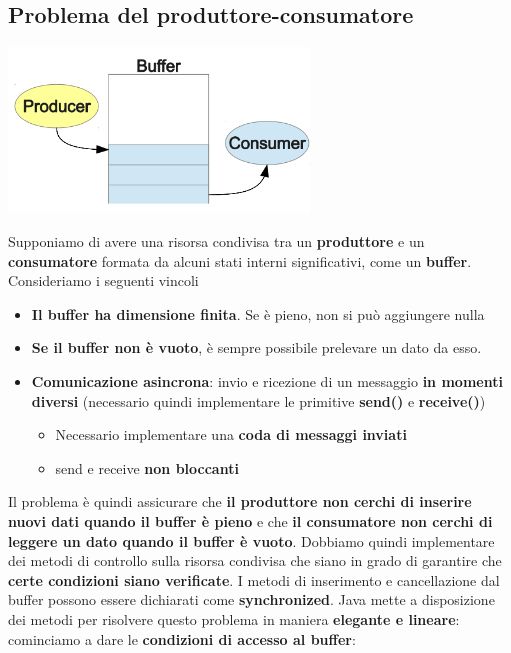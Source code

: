 \documentclass[12pt]{article}
\begin{document}
\subsection{Problema del produttore-consumatore}
\begin{center}
    \includegraphics[width = 0.60\textwidth]{Images/85.png}
\end{center}
Supponiamo di avere una risorsa condivisa tra un \textbf{produttore} e un \textbf{consumatore} formata da alcuni stati interni significativi, come un \textbf{buffer}. Consideriamo i seguenti vincoli
\begin{itemize}
    \item \textbf{Il buffer ha dimensione finita}. Se è pieno, non si può aggiungere nulla
    \item \textbf{Se il buffer non è vuoto}, è sempre possibile prelevare un dato da esso.
    \item \textbf{Comunicazione asincrona}: invio e ricezione di un messaggio \textbf{in momenti diversi} (necessario quindi implementare le primitive \textbf{send()} e \textbf{receive()})
          \begin{itemize}
              \item Necessario implementare una \textbf{coda di messaggi inviati}
              \item send e receive \textbf{non bloccanti}
          \end{itemize}
\end{itemize}
Il problema è quindi assicurare che \textbf{il produttore non cerchi di inserire nuovi dati quando il buffer è pieno} e che \textbf{il consumatore non cerchi di leggere un dato quando il buffer è vuoto}. \newline
Dobbiamo quindi implementare dei metodi di controllo sulla risorsa condivisa che siano in grado di garantire che \textbf{certe condizioni siano verificate}. I metodi di inserimento e cancellazione dal buffer possono essere dichiarati come \textbf{synchronized}. Java mette a disposizione dei metodi per risolvere questo problema in maniera \textbf{elegante e lineare}: cominciamo a dare le \textbf{condizioni di accesso al buffer}:
\end{document}
